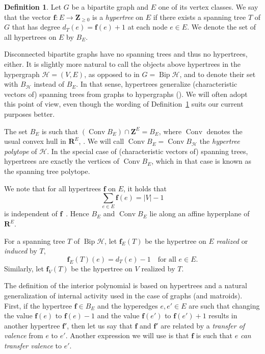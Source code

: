 \documentclass[10pt]{amsart}
\theoremstyle{definition}\newtheorem{defi}[theo]{Definition}
\theoremstyle{remark}\newtheorem{rema}[theo]{Remark}
\newcommand{\R}{\mathbf{R}}
\newcommand{\Z}{\mathbf{Z}}
\newcommand{\HH}{\mathcal H}
\DeclareMathOperator{\bip}{Bip}
\DeclareMathOperator{\conv}{Conv}
\begin{document}
\begin{defi}
\label{def:hypertree}
Let $G$ be a bipartite graph and $E$ one of its vertex classes. We say that the vector $\mathbf f\colon E\to\Z_{\ge0}$ is a \emph{hypertree} on $E$ if there exists a spanning tree $T$ of $G$ that has degree $d_T(e)=\mathbf f(e)+1$ at each node $e\in E$. We denote the set of all hypertrees on $E$ by $B_{E}$.
\end{defi}

Disconnected bipartite graphs have no spanning trees and thus no hypertrees, either. It is slightly more natural to call the objects above hypertrees in the hypergraph $\HH=(V,E)$, as opposed to in $G=\bip\HH$, and to denote their set with $B_\HH$ instead of $B_E$. In that sense, hypertrees generalize (characteristic vectors of) spanning trees from graphs to hypergraphs (\cf \cite[Remark~3.2]{hiperTutte}). We will often adopt this point of view, even though the wording of Definition~\ref{def:hypertree} suits our current purposes better.

The set $B_E$ is such that $(\conv B_E)\cap\Z^E=B_{E}$, where $\conv$ denotes the usual convex hull in $\R^E$, \cf \cite[Lemma~3.4]{hiperTutte}. We will call $\conv B_{E}=\conv B_\HH$ the \emph{hypertree polytope} of $\HH$. In the special case of (characteristic vectors of) spanning trees, hypertrees are exactly the vertices of $\conv B_E$, which in that case is known as the spanning tree polytope.

We note that for all hypertrees $\mathbf f$ on $E$, it holds that 
\[\sum_{e\in E}\mathbf f(e)=|V|-1\]
is independent of $\mathbf f$~\cite[Theorem~3.4]{hiperTutte}. Hence $B_E$ and $\conv B_E$ lie along an affine hyperplane of $\R^E$.

For a spanning tree $T$ of $\bip \HH$, let $\mathbf f_E(T)$ be the hypertree on $E$ \emph{realized} or \emph{induced} by $T$, \ie
\[\mathbf f_E(T)(e)=d_T(e)-1 \quad \text{for all }e\in E.\]
Similarly, let $\mathbf f_V(T)$ be the hypertree on $V$ realized by $T$.

The definition of the interior polynomial is based on hypertrees and a natural generalization of internal activity used in the case of graphs (and matroids). First, if the hypertree $\mathbf{f}\in B_{E}$ and the hyperedges $e, e'\in E$ are such that changing the value $\mathbf{f}(e)$ to $\mathbf{f}(e)-1$ and the value $\mathbf{f}(e')$ to $\mathbf{f}(e')+1$ results in another hypertree $\mathbf{f'}$, then let us say that $\mathbf{f}$ and $\mathbf{f'}$ are related by a \emph{transfer of valence} from $e$ to $e'$. Another expression we will use is that $\mathbf f$ is such that $e$ \emph{can transfer valence} to $e'$.
\end{document}

